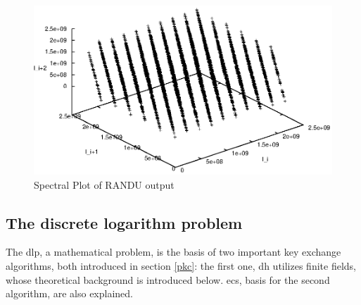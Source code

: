 \begin{figure}
    \centering
    \includegraphics[width=1\textwidth]{figures/randu}
    \caption{Spectral Plot of RANDU output}
    \label{fig:randu}
\end{figure}

\subsection{The discrete logarithm problem}\label{refDLP}
The \gls{dlp}, a mathematical problem, is the basis of two important key exchange algorithms, both introduced in section \ref{pkc}: the first one, \gls{dh} utilizes finite fields, whose
theoretical background is introduced below. \glspl{ec}, basis for the second algorithm, are also explained.

